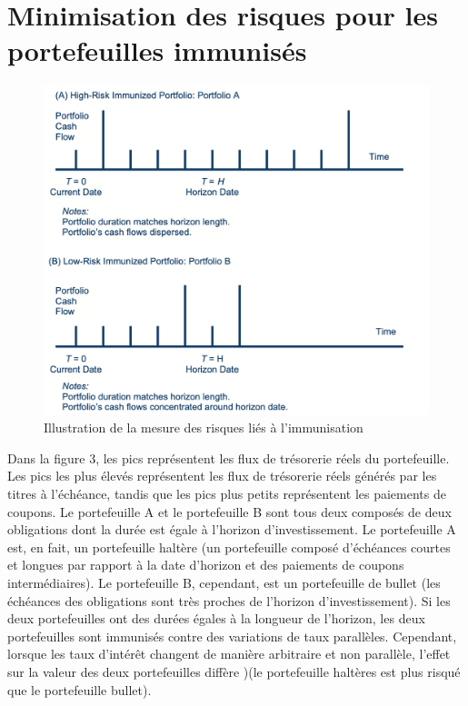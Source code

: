 \documentclass[12pt]{article}
\begin{document}
\section{Minimisation des risques pour les portefeuilles immunisés}
\begin{figure}[H]
\caption{Illustration de la mesure des risques liés à l'immunisation}
\centering
\includegraphics[width=14cm]{3}
\end{figure}

Dans la figure 3, les pics représentent les flux de trésorerie réels du portefeuille. Les pics les plus élevés représentent les flux de trésorerie réels générés par les titres à l'échéance, tandis que les pics plus petits représentent les paiements de coupons. Le portefeuille A et le portefeuille B sont tous deux composés de deux obligations dont la durée est égale à l'horizon d'investissement. Le portefeuille A est, en fait, un portefeuille haltère (un portefeuille composé d'échéances courtes et longues par rapport à la date d'horizon et des paiements de coupons intermédiaires). Le portefeuille B, cependant, est un portefeuille de bullet (les échéances des obligations sont très proches de l'horizon d'investissement). Si les deux portefeuilles ont des durées égales à la longueur de l'horizon, les deux portefeuilles sont immunisés contre des variations de taux parallèles. Cependant, lorsque les taux d'intérêt changent de manière arbitraire et non parallèle, l'effet sur la valeur des deux portefeuilles diffère )(le portefeuille haltères est plus risqué que le portefeuille bullet).
\end{document}
